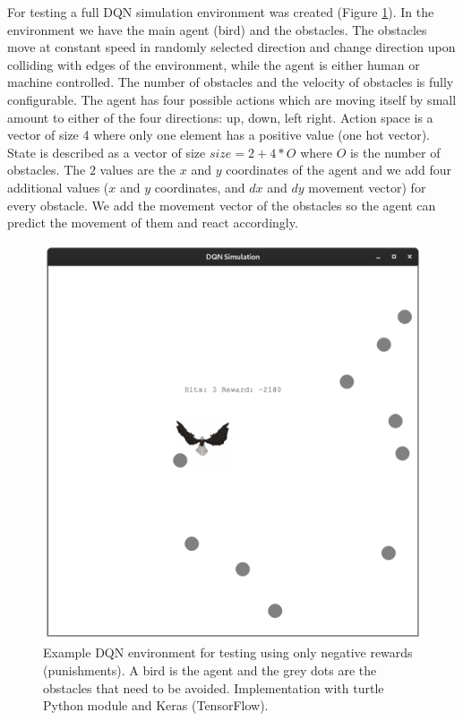 \documentclass[b5paper]{book}
\begin{document}
For testing a full DQN simulation environment was created (Figure \ref{fig:bird}). In the environment we have the main agent (bird) and the obstacles. The obstacles move at constant speed in randomly selected direction and change direction upon colliding with edges of the environment, while the agent is either human or machine controlled. The number of obstacles and the velocity of obstacles is fully configurable. The agent has four possible actions which are moving itself by small amount to either of the four directions: up, down, left right. Action space is a vector of size 4 where only one element has a positive value (one hot vector). State is described as a vector of size \( size = 2 + 4 * O \) where \( O \) is the number of obstacles. The \( 2 \) values are the \( x \) and \( y \) coordinates of the agent and we add four additional values (\( x \) and \( y \) coordinates, and \( dx \) and \( dy \) movement vector) for every obstacle. We add the movement vector of the obstacles so the agent can predict the movement of them and react accordingly.

\begin{figure}[!ht]
  \centering
  \includegraphics[scale=0.1]{figures/dqn_bird.png} 
  \caption{Example DQN environment for testing using only negative rewards (punishments). A bird is the agent and the grey dots are the obstacles that need to be avoided. Implementation with turtle Python module and Keras (TensorFlow).}
  \label{fig:bird}
\end{figure}
\end{document}
